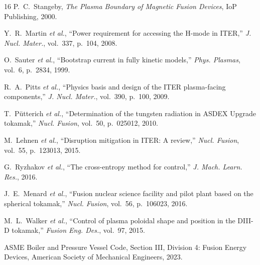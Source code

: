 \documentclass[11pt,a4paper]{article}
\begin{document}
\begin{thebibliography}{16}
 P.~C.~Stangeby,
\textit{The Plasma Boundary of Magnetic Fusion Devices},
IoP Publishing, 2000.

 Y.~R.~Martin \textit{et al.},
``Power requirement for accessing the H-mode in ITER,''
\textit{J. Nucl. Mater.}, vol.~337, p.~104, 2008.

 O.~Sauter \textit{et al.},
``Bootstrap current in fully kinetic models,''
\textit{Phys. Plasmas}, vol.~6, p.~2834, 1999.

 R.~A.~Pitts \textit{et al.},
``Physics basis and design of the ITER plasma-facing components,''
\textit{J. Nucl. Mater.}, vol.~390, p.~100, 2009.

 T.~P\"utterich \textit{et al.},
``Determination of the tungsten radiation in ASDEX Upgrade tokamak,''
\textit{Nucl. Fusion}, vol.~50, p.~025012, 2010.

 M.~Lehnen \textit{et al.},
``Disruption mitigation in ITER: A review,''
\textit{Nucl. Fusion}, vol.~55, p.~123013, 2015.

 G.~Ryzhakov \textit{et al.},
``The cross-entropy method for control,''
\textit{J. Mach. Learn. Res.}, 2016.

 J.~E.~Menard \textit{et al.},
``Fusion nuclear science facility and pilot plant
based on the spherical tokamak,''
\textit{Nucl. Fusion}, vol.~56, p.~106023, 2016.

 M.~L.~Walker \textit{et al.},
``Control of plasma poloidal shape and position in the DIII-D tokamak,''
\textit{Fusion Eng. Des.}, vol.~97, 2015.

 ASME Boiler and Pressure Vessel Code,
Section III, Division 4: Fusion Energy Devices,
American Society of Mechanical Engineers, 2023.

\end{thebibliography}
\end{document}
